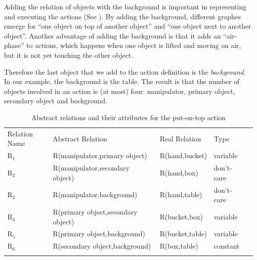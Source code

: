 Adding the relation of objects with the background is important in representing and executing the actions (See \cite{TAMD13}).
By adding the background, different graphes emerge for ``one object on top of another object'' and ``one object next to another object''.
Another advantage of adding the background is that it adds an ``air-phase'' to actions,
which happens when one object is lifted and moving on air, but it is not yet touching the other object.

Therefore the last object that we add to the action definition is the \textit{background}.
In our example, the background is the table.
The result is that the number of objects involved in an action is (at most) four: manipulator, primary object, secondary object and background.

\begin{table}
\caption{Abstract relations and their attributes for the put-on-top action}
\begin{tabular}{ lllll }
\hline\noalign{\smallskip}
Relation Name & Abstract Relation & Real Relation & Type \\
\noalign{\smallskip}\hline\noalign{\smallskip}
$\text{R}_1$  & R(manipulator,primary object) & R(hand,bucket) & variable \\
$\text{R}_2$  & R(manipulator,secondary object)& R(hand,box) & don't-care \\
$\text{R}_3$  & R(manipulator,background) & R(hand,table) & don't-care \\
$\text{R}_4$  & R(primary object,secondary object) & R(bucket,box) & variable  \\
$\text{R}_5$  & R(primary object,background) & R(bucket,table) & variable \\
$\text{R}_6$  & R(secondary object,background)& R(box,table) & constant \\
\noalign{\smallskip}\hline
\end{tabular}
\label{tab:relations}
\end{table}

